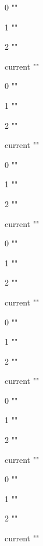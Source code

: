 \documentclass[a4paper]{article}
\begin{document}
0 "\stealstack"

1 "\stealstacka"

2 "\stealstackb"

current "\currentpath"


0 "\stealstack"

1 "\stealstacka"

2 "\stealstackb"

current "\currentpath"


0 "\stealstack"

1 "\stealstacka"

2 "\stealstackb"

current "\currentpath"

\stealpop

0 "\stealstack"

1 "\stealstacka"

2 "\stealstackb"

current "\currentpath"


0 "\stealstack"

1 "\stealstacka"

2 "\stealstackb"

current "\currentpath"

\stealpop

0 "\stealstack"

1 "\stealstacka"

2 "\stealstackb"

current "\currentpath"

\stealpop

0 "\stealstack"

1 "\stealstacka"

2 "\stealstackb"

current "\currentpath"
\end{document}
